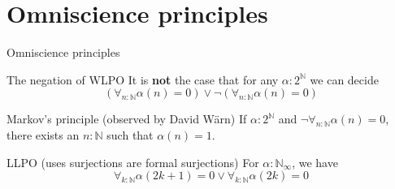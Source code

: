 \documentclass{beamer}
\begin{document}
\section{Omniscience principles}
\begin{frame}{Omniscience principles} 
  \begin{block}{The negation of WLPO}
    It is \textbf{not} the case that for any $\alpha:2^\mathbb N$ we can decide 
    \vspace{-0.2cm}
    $$
    (\forall_{n:\mathbb N} \alpha(n)  = 0 )
    \vee
    \neg (\forall_{n:\mathbb N} \alpha(n)  = 0 )
    $$
  \end{block}
  \pause
  \begin{block}{Markov's principle (observed by David W\"arn) }
    If $\alpha: 2^\mathbb N$ and $\neg 
    \forall_{n:\mathbb N} \alpha(n)  = 0 $, 
    there exists an $n:\mathbb N$ such that $\alpha(n) = 1$. 
  \end{block}
  \pause
  \begin{block}{LLPO (uses surjections are formal surjections)}
    For $\alpha:\mathbb N_\infty$, we have 
    \vspace{-0.2cm}
    $$ 
    \forall_{k:\mathbb N} \alpha(2k+1) = 0 \vee
    \forall_{k:\mathbb N} \alpha(2k) = 0
    $$
  \end{block}
\end{frame}
\end{document}
